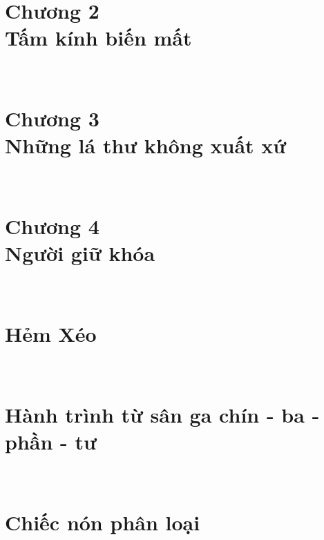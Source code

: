 \documentclass[a4paper, 12pt]{report}
\begin{document}
\newpage
\pagecolor[HTML]{e6e6ff}

\chapter*{Chương 2\\Tấm kính biến mất}

\newpage
\

\newpage
\pagecolor[HTML]{fff2f2}
\chapter*{Chương 3\\Những lá thư không xuất xứ}

\newpage
\

\newpage   
\pagecolor[HTML]{ffffff}
\chapter*{Chương 4\\Người giữ khóa}

\newpage
\

\newpage
\setcounter{chapter}{4}
\chapter{Hẻm Xéo}

\newpage
\

\newpage
\chapter{Hành trình từ sân ga chín - ba - phần - tư}

\newpage
\

\newpage
\chapter{Chiếc nón phân loại}
\end{document}
